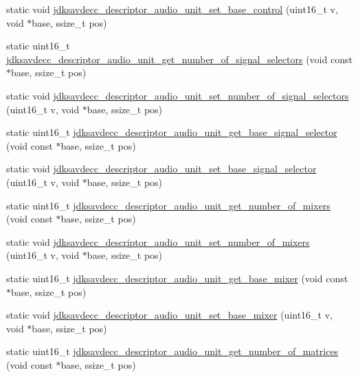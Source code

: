 \begin{DoxyCompactItemize}
\item 
static void \hyperlink{group__descriptor__audio_ga0350d12ff4567b3e8925c3426a6b74bb}{jdksavdecc\+\_\+descriptor\+\_\+audio\+\_\+unit\+\_\+set\+\_\+base\+\_\+control} (uint16\+\_\+t v, void $\ast$base, ssize\+\_\+t pos)
\item 
static uint16\+\_\+t \hyperlink{group__descriptor__audio_ga5f9fad0e6cd76c2df383ae7ed608875c}{jdksavdecc\+\_\+descriptor\+\_\+audio\+\_\+unit\+\_\+get\+\_\+number\+\_\+of\+\_\+signal\+\_\+selectors} (void const $\ast$base, ssize\+\_\+t pos)
\item 
static void \hyperlink{group__descriptor__audio_gab2e755e52950a3b85803d78e981f113c}{jdksavdecc\+\_\+descriptor\+\_\+audio\+\_\+unit\+\_\+set\+\_\+number\+\_\+of\+\_\+signal\+\_\+selectors} (uint16\+\_\+t v, void $\ast$base, ssize\+\_\+t pos)
\item 
static uint16\+\_\+t \hyperlink{group__descriptor__audio_ga328bab081bcc637cf7cd4bac37d0dbc4}{jdksavdecc\+\_\+descriptor\+\_\+audio\+\_\+unit\+\_\+get\+\_\+base\+\_\+signal\+\_\+selector} (void const $\ast$base, ssize\+\_\+t pos)
\item 
static void \hyperlink{group__descriptor__audio_gadb27a83d26fbc306e1cf8c641e91c860}{jdksavdecc\+\_\+descriptor\+\_\+audio\+\_\+unit\+\_\+set\+\_\+base\+\_\+signal\+\_\+selector} (uint16\+\_\+t v, void $\ast$base, ssize\+\_\+t pos)
\item 
static uint16\+\_\+t \hyperlink{group__descriptor__audio_gacb82e38b2002768ec8acf63cea9374ab}{jdksavdecc\+\_\+descriptor\+\_\+audio\+\_\+unit\+\_\+get\+\_\+number\+\_\+of\+\_\+mixers} (void const $\ast$base, ssize\+\_\+t pos)
\item 
static void \hyperlink{group__descriptor__audio_ga81a400b31de2387af3c1ddc955b6c0b3}{jdksavdecc\+\_\+descriptor\+\_\+audio\+\_\+unit\+\_\+set\+\_\+number\+\_\+of\+\_\+mixers} (uint16\+\_\+t v, void $\ast$base, ssize\+\_\+t pos)
\item 
static uint16\+\_\+t \hyperlink{group__descriptor__audio_gacdf66ebbeec1e83e48d843ea97267a66}{jdksavdecc\+\_\+descriptor\+\_\+audio\+\_\+unit\+\_\+get\+\_\+base\+\_\+mixer} (void const $\ast$base, ssize\+\_\+t pos)
\item 
static void \hyperlink{group__descriptor__audio_ga7d435a7a0229e44e97eedbe0cfbb54a1}{jdksavdecc\+\_\+descriptor\+\_\+audio\+\_\+unit\+\_\+set\+\_\+base\+\_\+mixer} (uint16\+\_\+t v, void $\ast$base, ssize\+\_\+t pos)
\item 
static uint16\+\_\+t \hyperlink{group__descriptor__audio_ga7f48988c4ac098e49e1f7ae439f31628}{jdksavdecc\+\_\+descriptor\+\_\+audio\+\_\+unit\+\_\+get\+\_\+number\+\_\+of\+\_\+matrices} (void const $\ast$base, ssize\+\_\+t pos)

\end{DoxyCompactItemize}
